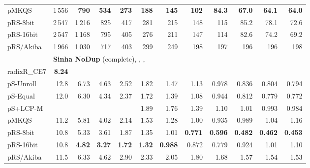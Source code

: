 \documentclass[a4paper]{myjournal}
\begin{document}
\begin{table}
\begin{tabular}{l|*{11}{r}|@{}}
        pMKQS & 1\,556 & \bf 790 & \bf 534 & \bf 273 & \bf 188 & \bf 145 & \bf 102 & \bf 84.3 & \bf 67.0 & \bf 64.1 & \bf 64.0 \\
     pRS-8bit & 2\,547 &  1\,216 &     825 &     417 &     281 &     215 &     148 &      115 &     85.2 &     78.1 &     72.6 \\
    pRS-16bit & 2\,547 &  1\,168 &     795 &     405 &     276 &     211 &     147 &      114 &     82.6 &     74.2 &     69.2 \\
    pRS/Akiba & 1\,966 &  1\,030 &     717 &     403 &     299 &     249 &     198 &      197 &      196 &      196 &      198 \\ \hline
& \multicolumn{11}{l|}{\textbf{Sinha NoDup} (complete), , , } \\ \cline{2-12}
radixR\_CE7 & \bf 8.24 &  &  &  &  &  &  &  &  &  &  \\
pS-Unroll & 12.8 &     6.73 &     4.63 &     2.52 &     1.82 &      1.47 &      1.13 &     0.978 &     0.836 &     0.804 &     0.794 \\
 pS-Equal & 12.0 &     6.30 &     4.34 &     2.37 &     1.72 &      1.39 &      1.08 &     0.944 &     0.812 &     0.779 &     0.772 \\
 pS+LCP-M &      &          &          &          &     1.89 &      1.76 &      1.39 &      1.10 &      1.01 &     0.993 &     0.984 \\
        pMKQS & 11.2 &     5.81 &     4.02 &     2.14 &     1.53 &      1.28 &      1.00 &     0.935 &     0.989 &      1.04 &      1.16 \\
     pRS-8bit & 10.8 &     5.33 &     3.61 &     1.87 &     1.35 &      1.01 & \bf 0.771 & \bf 0.596 & \bf 0.482 & \bf 0.462 & \bf 0.453 \\
    pRS-16bit & 10.8 & \bf 4.82 & \bf 3.27 & \bf 1.72 & \bf 1.32 & \bf 0.988 &     0.872 &     0.779 &     0.924 &      1.01 &      1.10 \\
    pRS/Akiba & 11.5 &     6.33 &     4.62 &     2.90 &     2.33 &      2.05 &      1.80 &      1.68 &      1.57 &      1.54 &      1.53 \\ \hline
\end{tabular}
\end{table}
\end{document}
